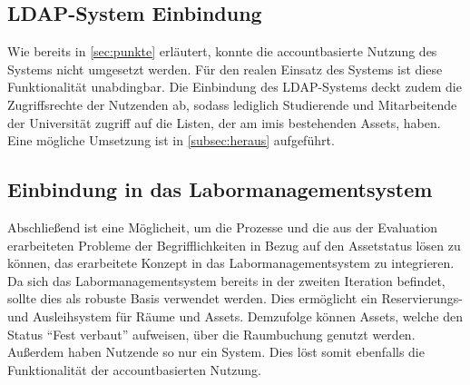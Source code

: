 \subsection{LDAP-System Einbindung}
Wie bereits in \ref{sec:punkte} erläutert, konnte die accountbasierte Nutzung des Systems nicht
umgesetzt werden. Für den realen Einsatz des Systems ist diese Funktionalität unabdingbar. Die
Einbindung des  LDAP-Systems deckt zudem die Zugriffsrechte der Nutzenden ab, sodass lediglich
Studierende und Mitarbeitende der Universität zugriff auf die Listen, der am \ac{imis} bestehenden Assets, haben. Eine
mögliche Umsetzung ist in \ref{subsec:heraus} aufgeführt.

\subsection{Einbindung in das Labormanagementsystem}
Abschließend ist eine Möglicheit, um die Prozesse und die aus der Evaluation
erarbeiteten Probleme der Begrifflichkeiten in Bezug auf den Assetstatus lösen
zu können, das erarbeitete Konzept in das Labormanagementsystem zu  integrieren. Da sich das Labormanagementsystem bereits in der zweiten
Iteration befindet, sollte dies als robuste Basis verwendet werden. Dies
ermöglicht ein Reservierungs- und Ausleihsystem für Räume und Assets. Demzufolge
können Assets, welche den Status \enquote{Fest verbaut} aufweisen, über die
Raumbuchung genutzt werden. Außerdem haben Nutzende so nur ein System. Dies löst
somit ebenfalls die Funktionalität der accountbasierten Nutzung.


